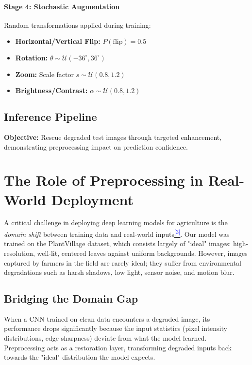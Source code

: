 \documentclass[12pt,a4paper]{article}
\newcommand{\citeref}[1]{\hyperref[ref:#1]{\textcolor{blue}{\large\textsuperscript{[#1]}}}}
\begin{document}
\paragraph{Stage 4: Stochastic Augmentation}
Random transformations applied during training:
\begin{itemize}
    \item \textbf{Horizontal/Vertical Flip:} $P(\text{flip}) = 0.5$
    \item \textbf{Rotation:} $\theta \sim \mathcal{U}(-36^{\circ}, 36^{\circ})$
    \item \textbf{Zoom:} Scale factor $s \sim \mathcal{U}(0.8, 1.2)$
    \item \textbf{Brightness/Contrast:} $\alpha \sim \mathcal{U}(0.8, 1.2)$
\end{itemize}

\subsection*{Inference Pipeline}

\textbf{Objective:} Rescue degraded test images through targeted enhancement, demonstrating preprocessing impact on prediction confidence.

\section*{The Role of Preprocessing in Real-World Deployment}

A critical challenge in deploying deep learning models for agriculture is the \textit{domain shift} between training data and real-world inputs\citeref{3}. Our model was trained on the PlantVillage dataset, which consists largely of "ideal" images: high-resolution, well-lit, centered leaves against uniform backgrounds. However, images captured by farmers in the field are rarely ideal; they suffer from environmental degradations such as harsh shadows, low light, sensor noise, and motion blur.

\subsection*{Bridging the Domain Gap}
When a CNN trained on clean data encounters a degraded image, its performance drops significantly because the input statistics (pixel intensity distributions, edge sharpness) deviate from what the model learned. Preprocessing acts as a restoration layer, transforming degraded inputs back towards the "ideal" distribution the model expects.
\end{document}
